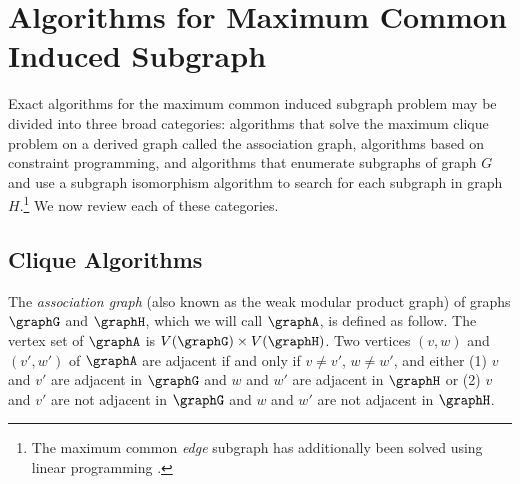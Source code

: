 
\section{Algorithms for Maximum Common Induced Subgraph}\label{sec:mcs-algorithms}


Exact algorithms for the maximum common induced subgraph problem may be divided
into three broad categories: algorithms that solve the maximum clique problem
on a derived graph called the association graph, algorithms based on constraint
programming, and algorithms that enumerate subgraphs of graph $G$ and use a
subgraph isomorphism algorithm to search for each subgraph in graph
$H$.\footnote{The maximum common \emph{edge} subgraph has additionally been
solved using linear programming
\citep{marenco1999algoritmo,DBLP:journals/dam/BahienseMPS12}.} We now review
each of these categories.

\subsection{Clique Algorithms}\label{subsec:clique-algorithms}

The \emph{association graph} (also known as the weak modular product graph)
of graphs $\graphG$ and $\graphH$, which we will call
$\graphA$, is defined as follow.  The vertex set of $\graphA$ is $V(\graphG)
\times V(\graphH)$.  Two vertices $(v,w)$ and $(v',w')$ of $\graphA$ are
adjacent if and only if $v \not= v'$, $w \not= w'$, and either (1) $v$ and $v'$
are adjacent in $\graphG$ and $w$ and $w'$ are adjacent in $\graphH$ or (2) $v$
and $v'$ are not adjacent in $\graphG$ and $w$ and $w'$ are not adjacent in
$\graphH$.

